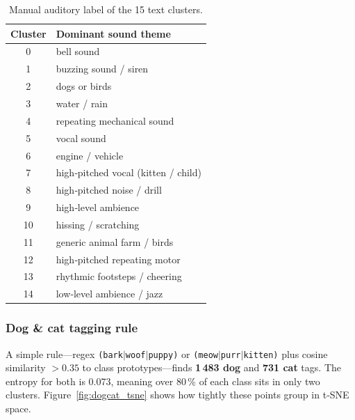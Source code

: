 \documentclass{article}
\begin{document}
\begin{table}[h]
  \caption{Manual auditory label of the 15 text clusters.}
  \label{tab:text_themes}
  \centering
  \small
  \begin{tabular}{cl}
    \toprule
    Cluster & Dominant sound theme \\ \midrule
    0 & bell sound \\
    1 & buzzing sound / siren \\
    2 & dogs or birds \\
    3 & water / rain \\
    4 & repeating mechanical sound \\
    5 & vocal sound \\
    6 & engine / vehicle \\
    7 & high‑pitched vocal (kitten / child) \\
    8 & high‑pitched noise / drill \\
    9 & high‑level ambience \\
    10 & hissing / scratching \\
    11 & generic animal farm / birds \\
    12 & high‑pitched repeating motor \\
    13 & rhythmic footsteps / cheering \\
    14 & low‑level ambience / jazz \\
    \bottomrule
  \end{tabular}
\end{table}

\subsubsection{Dog \& cat tagging rule}
A simple rule—regex \texttt{(bark$|$woof$|$puppy)} or \texttt{(meow$|$purr$|$kitten)} plus cosine similarity $>0.35$ to class prototypes—finds \textbf{1\,483 dog} and \textbf{731 cat} tags. The entropy for both is 0.073, meaning over 80\,\% of each class sits in only two clusters. Figure~\ref{fig:dogcat_tsne} shows how tightly these points group in t‑SNE space.
\end{document}
